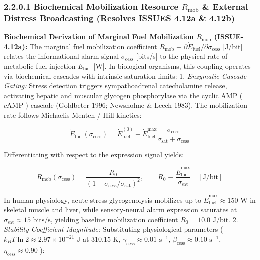 \documentclass[11pt,a4paper]{article}
\theoremstyle{definition}
\theoremstyle{remark}
\begin{document}
\subsubsection{2.2.0.1 Biochemical Mobilization Resource $R_{\text{mob}}$ \& External Distress Broadcasting (Resolves ISSUES 4.12a \& 4.12b)}

\textbf{Biochemical Derivation of Marginal Fuel Mobilization $R_{\text{mob}}$ (ISSUE-4.12a):} The marginal fuel mobilization coefficient $R_{\text{mob}} \equiv \partial\dot{E}_{\text{fuel}}/\partial\sigma_{\text{cess}}$ [J/bit] relates the informational alarm signal $\sigma_{\text{cess}}$ [bits/s] to the physical rate of metabolic fuel injection $\dot{E}_{\text{fuel}}$ [W]. In biological organisms, this coupling operates via biochemical cascades with intrinsic saturation limits:
1. \textit{Enzymatic Cascade Gating:} Stress detection triggers sympathoadrenal catecholamine release, activating hepatic and muscular glycogen phosphorylase via the cyclic AMP ( $c\text{AMP}$ ) cascade (Goldbeter 1996; Newsholme \& Leech 1983). The mobilization rate follows Michaelis-Menten / Hill kinetics:


\begin{equation}
\dot{E}_{\text{fuel}}(\sigma_{\text{cess}}) = \dot{E}_{\text{fuel}}^{(0)} + \dot{E}_{\text{fuel}}^{\max} \frac{\sigma_{\text{cess}}}{\sigma_{\text{sat}} + \sigma_{\text{cess}}}
\end{equation}


Differentiating with respect to the expression signal yields:


\begin{equation}
\boxed{R_{\text{mob}}(\sigma_{\text{cess}}) = \frac{R_0}{\left(1 + \sigma_{\text{cess}}/\sigma_{\text{sat}}\right)^2}, \qquad R_0 \equiv \frac{\dot{E}_{\text{fuel}}^{\max}}{\sigma_{\text{sat}}} \quad [\text{J/bit}]}
\end{equation}


In human physiology, acute stress glycogenolysis mobilizes up to $\dot{E}_{\text{fuel}}^{\max} \approx 150\text{ W}$ in skeletal muscle and liver, while sensory-neural alarm expression saturates at $\sigma_{\text{sat}} \approx 15\text{ bits/s}$, yielding baseline mobilization coefficient $R_0 = 10.0\text{ J/bit}$.
2. \textit{Stability Coefficient Magnitude:} Substituting physiological parameters ( $k_B T \ln 2 \approx 2.97 \times 10^{-21}\text{ J}$ at $310.15\text{ K}$, $\gamma_{\text{cess}} \approx 0.01\text{ s}^{-1}$, $\beta_{\text{cess}} \approx 0.10\text{ s}^{-1}$, $\eta_{\text{cess}} \approx 0.90$ ):
\end{document}
